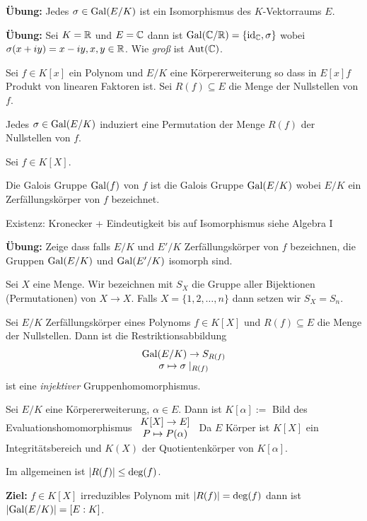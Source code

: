 \textbf{Übung:} Jedes $\sigma \in \operatorname{Gal}(E / K)$ ist ein Isomorphismus des $K$-Vektorraums $E$.

\textbf{Übung:} Sei $K = \mathbb{R}$ und $E = \mathbb{C}$ dann ist $\operatorname{Gal}(\mathbb{C} / \mathbb{R}) = \{\operatorname{id}_{\mathbb{C}}, \sigma\} $ wobei $\sigma(x+iy) = x-iy, x,y \in \mathbb{R}$.
Wie \emph{groß} ist $\operatorname{Aut}(\mathbb{C})$.

Sei $f \in K[x]$ ein Polynom und $E / K $ eine Körpererweiterung so dass in $E[x] f$ Produkt von linearen Faktoren ist.
Sei $R(f) \subseteq E$ die Menge der Nullstellen von $f$.

\begin{lemma}
	Jedes $\sigma \in \operatorname{Gal}(E / K)$ induziert eine Permutation der Menge $R(f)$ der Nullstellen von $f$.
\end{lemma}


Sei $f \in K[X]$.
\begin{definition}
	Die Galois Gruppe $\operatorname{Gal}(f)$ von $f$ ist die Galois Gruppe $\operatorname{Gal}(E / K)$ wobei $E / K$ ein Zerfällungskörper
	von $f$ bezeichnet.
\end{definition}
Existenz: Kronecker + Eindeutigkeit bis auf Isomorphismus siehe Algebra I

\textbf{Übung:} Zeige dass falls $E / K$ und $E' / K$ Zerfällungskörper von $f$ bezeichnen, die Gruppen
$\operatorname{Gal}(E / K)$ und $\operatorname{Gal}(E'/K)$ isomorph sind.

\begin{notation}
	Sei $X$ eine Menge. Wir bezeichnen mit $S_{X}$ die Gruppe aller Bijektionen (Permutationen) von $X \to X$.
	Falls $X = \{1,2,\ldots,n\}$ dann setzen wir $S_{X} = S_{n}$.
\end{notation}

\begin{lemma}
	Sei $E / K$ Zerfällungskörper eines Polynoms $f \in K[X]$ und $R(f) \subseteq E$ die Menge der Nullstellen.
	Dann ist die Restriktionsabbildung 
	\[
		\begin{array}{c} \operatorname{Gal}(E / K) \to S_{R(f)}\\ \sigma \mapsto  \sigma \mid_{R(f)}\\ \end{array}
	\] 
	ist eine \emph{injektiver} Gruppenhomomorphismus.
\end{lemma}



Sei $E / K$ eine Körpererweiterung, $\alpha \in E$. Dann ist $K[\alpha] := $ Bild des Evaluationshomomorphismus $\begin{array}{c} K[X] \to E]\\ P \mapsto P(\alpha)\\ \end{array}$ 
Da $E$ Körper ist $K[X]$ ein Integritätsbereich und $K(X)$ der Quotientenkörper von $K[\alpha]$.

Im allgemeinen ist $\abs{R(f)} \leq \deg(f)$. 

\textbf{Ziel:} $f \in K[X]$ irreduzibles Polynom mit $\abs{R(f)} = \deg(f)$ dann ist  $\abs{\operatorname{Gal}(E / K)} = [E:K]$.

